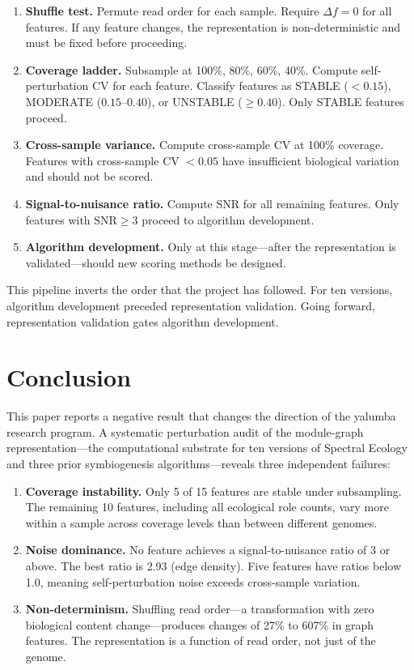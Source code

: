 \documentclass{../yalumba}
\begin{document}
\begin{enumerate}
  \item \textbf{Shuffle test.}  Permute read order for each sample.
    Require $\Delta f = 0$ for all features.  If any feature changes,
    the representation is non-deterministic and must be fixed before
    proceeding.
  \item \textbf{Coverage ladder.}  Subsample at 100\%, 80\%, 60\%,
    40\%.  Compute self-perturbation CV for each feature.  Classify
    features as STABLE ($< 0.15$), MODERATE ($0.15$--$0.40$), or
    UNSTABLE ($\geq 0.40$).  Only STABLE features proceed.
  \item \textbf{Cross-sample variance.}  Compute cross-sample CV at
    100\% coverage.  Features with cross-sample CV $< 0.05$ have
    insufficient biological variation and should not be scored.
  \item \textbf{Signal-to-nuisance ratio.}  Compute SNR for all
    remaining features.  Only features with $\text{SNR} \geq 3$
    proceed to algorithm development.
  \item \textbf{Algorithm development.}  Only at this stage---after
    the representation is validated---should new scoring methods
    be designed.
\end{enumerate}

This pipeline inverts the order that the project has followed.  For ten
versions, algorithm development preceded representation validation.
Going forward, representation validation gates algorithm development.


\section{Conclusion}
\label{sec:conclusion}

This paper reports a negative result that changes the direction of the
yalumba research program.  A systematic perturbation audit of the
module-graph representation---the computational substrate for ten
versions of Spectral Ecology and three prior symbiogenesis
algorithms---reveals three independent failures:

\begin{enumerate}
  \item \textbf{Coverage instability.}  Only 5 of 15 features are
    stable under subsampling.  The remaining 10 features, including all
    ecological role counts, vary more within a sample across coverage
    levels than between different genomes.
  \item \textbf{Noise dominance.}  No feature achieves a
    signal-to-nuisance ratio of 3 or above.  The best ratio is 2.93
    (edge density).  Five features have ratios below 1.0, meaning
    self-perturbation noise exceeds cross-sample variation.
  \item \textbf{Non-determinism.}  Shuffling read order---a
    transformation with zero biological content change---produces
    changes of 27\% to 607\% in graph features.  The representation
    is a function of read order, not just of the genome.
\end{enumerate}
\end{document}
